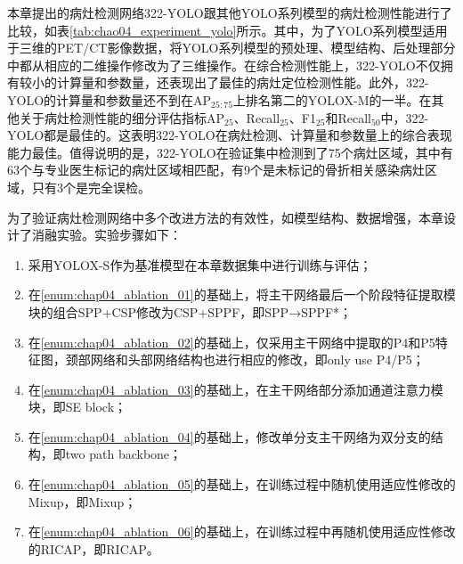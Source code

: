 本章提出的病灶检测网络322-YOLO跟其他YOLO系列模型的病灶检测性能进行了比较，如表\ref{tab:chao04_experiment_yolo}所示。其中，为了YOLO系列模型适用于三维的PET/CT影像数据，将YOLO系列模型的预处理、模型结构、后处理部分中都从相应的二维操作修改为了三维操作。在综合检测性能上，322-YOLO不仅拥有较小的计算量和参数量，还表现出了最佳的病灶定位检测性能。此外，322-YOLO的计算量和参数量还不到在AP\(_{25:75}\)上排名第二的YOLOX-M的一半。在其他关于病灶检测性能的细分评估指标AP\(_{25}\)、Recall\(_{25}\)、F1\(_{25}\)和Recall\(_{50}\)中，322-YOLO都是最佳的。这表明322-YOLO在病灶检测、计算量和参数量上的综合表现能力最佳。值得说明的是，322-YOLO在验证集中检测到了75个病灶区域，其中有63个与专业医生标记的病灶区域相匹配，有9个是未标记的骨折相关感染病灶区域，只有3个是完全误检。

为了验证病灶检测网络中多个改进方法的有效性，如模型结构、数据增强，本章设计了消融实验。实验步骤如下：
\begin{enumerate}[(1)]
  \item 采用YOLOX-S作为基准模型在本章数据集中进行训练与评估；\label{enum:chap04_ablation_01}
  \item 在\ref{enum:chap04_ablation_01}的基础上，将主干网络最后一个阶段特征提取模块的组合SPP+CSP修改为CSP+SPPF，即SPP→SPPF*；\label{enum:chap04_ablation_02}
  \item 在\ref{enum:chap04_ablation_02}的基础上，仅采用主干网络中提取的P4和P5特征图，颈部网络和头部网络结构也进行相应的修改，即only use P4/P5；\label{enum:chap04_ablation_03}
  \item 在\ref{enum:chap04_ablation_03}的基础上，在主干网络部分添加通道注意力模块，即SE block；\label{enum:chap04_ablation_04}
  \item 在\ref{enum:chap04_ablation_04}的基础上，修改单分支主干网络为双分支的结构，即two path backbone；\label{enum:chap04_ablation_05}
  \item 在\ref{enum:chap04_ablation_05}的基础上，在训练过程中随机使用适应性修改的Mixup，即Mixup；\label{enum:chap04_ablation_06}
  \item 在\ref{enum:chap04_ablation_06}的基础上，在训练过程中再随机使用适应性修改的RICAP，即RICAP。
\end{enumerate}

